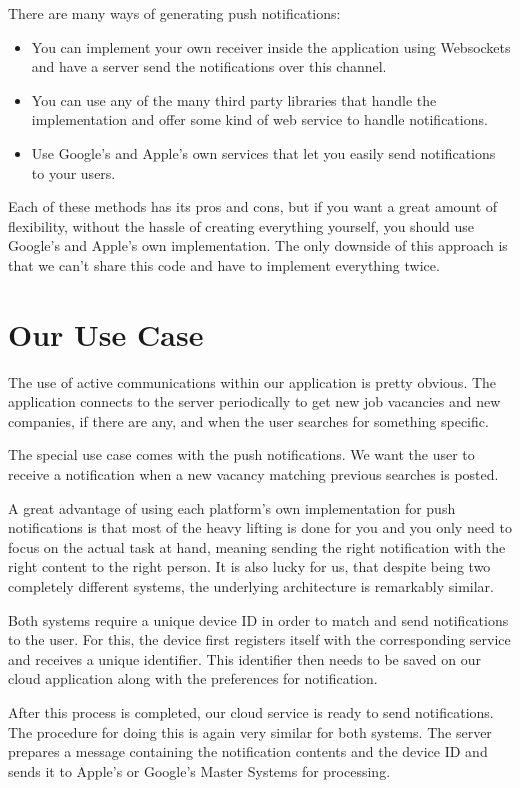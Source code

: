 There are many ways of generating push notifications:
\begin{itemize}
\item You can implement your own receiver inside the application using Websockets and have a server send the notifications over this channel.
\item You can use any of the many third party libraries that handle the implementation and offer some kind of web service to handle notifications.
\item Use Google's and Apple's own services that let you easily send notifications to your users.
\end{itemize}

Each of these methods has its pros and cons, but if you want a great amount of flexibility, without the hassle of creating everything yourself, you should use Google's and Apple's own implementation. The only downside of this approach is that we can't share this code and have to implement everything twice.


\section{Our Use Case}

The use of active communications within our application is pretty obvious. The application connects to the server periodically to get new job vacancies and new companies, if there are any, and when the user searches for something specific.

The special use case comes with the push notifications. We want the user to receive a notification when a new vacancy matching previous searches is posted.

A great advantage of using each platform's own implementation for push notifications is that most of the heavy lifting is done for you and you only need to focus on the actual task at hand, meaning sending the right notification with the right content to the right person. It is also lucky for us, that despite being two completely different systems, the underlying architecture is remarkably similar.

Both systems require a unique device ID in order to match and send notifications to the user. For this, the device first registers itself with the corresponding service and receives a unique identifier. This identifier then needs to be saved on our cloud application along with the preferences for notification.

After this process is completed, our cloud service is ready to send notifications. The procedure for doing this is again very similar for both systems. The server prepares a message containing the notification contents and the device ID and sends it to Apple's or Google's Master Systems for processing.\newline
\vfill

